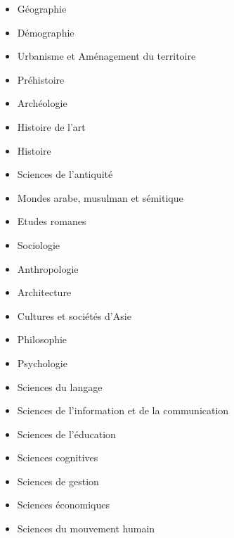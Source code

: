 	\label{ed-355-espaces-cultures-societes}

		\begin{itemize}
		\item Géographie
		\item Démographie
		\item Urbanisme et Aménagement du territoire
		\item Préhistoire
		\item Archéologie
		\item Histoire de l'art
		\item Histoire
		\item Sciences de l'antiquité
		\item Mondes arabe, musulman et sémitique
		\item Etudes romanes
		\item Sociologie
		\item Anthropologie
		\item Architecture
		\item Cultures et sociétés d'Asie
		\end{itemize}

	\label{ed-356-cognition-langage-education}

		\begin{itemize}
		\item Philosophie
		\item Psychologie
		\item Sciences du langage
		\item Sciences de l'information et de la communication
		\item Sciences de l'éducation
		\item Sciences cognitives
		\end{itemize}

	\label{ed-372-sciences-economiques-et-de-gestion}

		\begin{itemize}
		\item Sciences de gestion
		\item Sciences économiques
		\end{itemize}

	\label{ed-463-sciences-du-mouvement-humain}

		\begin{itemize}
		\item Sciences du mouvement humain 
		\end{itemize}

